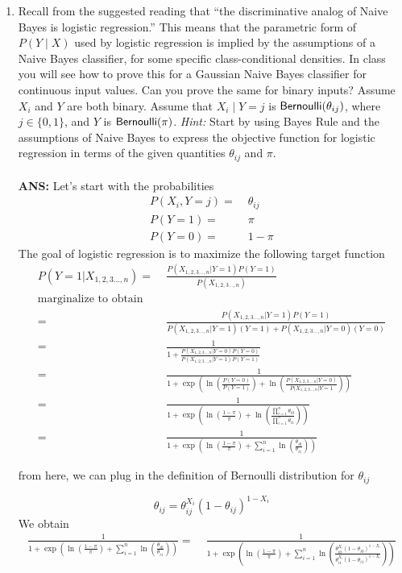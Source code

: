 \begin{enumerate}
\item Recall from the suggested reading that ``the
  discriminative analog of Naive Bayes is logistic regression.'' This
  means that the parametric form of $P(Y \mid X)$ used by logistic
  regression is implied by the assumptions of a Naive Bayes
  classifier, for some specific class-conditional densities. In class
  you will see how to prove this for a Gaussian Naive Bayes classifier
  for continuous input values. Can you prove the same for binary
  inputs? Assume $X_i$ and $Y$ are both binary. Assume that $X_i \mid
  Y=j$ is $\textsf{Bernoulli} (\theta_{ij})$, where $j \in \{0,1\}$, and $Y$ is
  $\textsf{Bernoulli}(\pi)$.
\emph{Hint:} Start by using Bayes Rule and the assumptions of Naive Bayes to express the objective function for logistic regression in terms of the given quantities $\theta_{ij}$ and $\pi$.
\\
\\{\bf ANS: }
Let's start with the probabilities
\begin{align*}
P(X_i, Y = j) =&\; \theta_{ij}\\
P(Y = 1) =&\; \pi\\
P(Y = 0) =&\; 1 - \pi
\end{align*}
The goal of logistic regression is to maximize the following target function
\begin{align*}
P(Y = 1 | X_{1, 2, 3 ..., n}) =&\; \frac{P(X_{1, 2, 3 ..., n} | Y = 1)P(Y=1)}{P(X_{1, 2, 3 ..., n})}\\
 \text{marginalize to obtain} \\
=&\; \frac{P(X_{1, 2, 3 ..., n} | Y = 1)P(Y=1)}{P(X_{1, 2, 3 ..., n}|Y=1)(Y=1)+P(X_{1, 2, 3 ..., n}|Y=0)(Y=0)}\\
 =&\; \frac{1}{1+\frac{P(X_{1, 2, 3 ..., n}|Y=0)P(Y=0)}{P(X_{1, 2, 3 ..., n}|Y=1)P(Y=1)}}\\
 =&\; \frac{1}{1 + \exp(\ln(\frac{P(Y=0)}{P(Y=1)}) + \ln(\frac{P(X_{1, 2, 3 ..., n}|Y=0)}{P(X_{1, 2, 3 ..., n}|Y=1}))}\\
 =&\; \frac{1}{1 + \exp(\ln(\frac{1-\pi}{\pi}) + \ln(\frac{\prod_{i = 1}^n \theta_{i0}}{\prod_{i = 1}^n \theta_{i1}}))}\\
 =&\; \frac{1}{1 + \exp(\ln(\frac{1-\pi}{\pi}) + \sum_{i=1}^n\ln(\frac{\theta_{i0}}{\theta_{i1}}))}
\end{align*}

from here, we can plug in the definition of Bernoulli distribution for $\theta_{ij}$

\[
\theta_{ij} = \theta_{ij}^{X_i}(1-\theta_{ij})^{1-X_i}
\]
We obtain
\begin{align*}
\frac{1}{1 + \exp(\ln(\frac{1-\pi}{\pi}) + \sum_{i=1}^n\ln(\frac{\theta_{i0}}{\theta_{i1}}))} 
=&\; \frac{1}{1 + \exp(\ln(\frac{1-\pi}{\pi}) + \sum_{i=1}^n\ln(\frac{\theta_{i0}^{X_i}(1-\theta_{i0})^{1-X_i}}{\theta_{i1}^{X_i}(1-\theta_{i1})^{1-X_i}}))}
\end{align*}


\end{enumerate}
